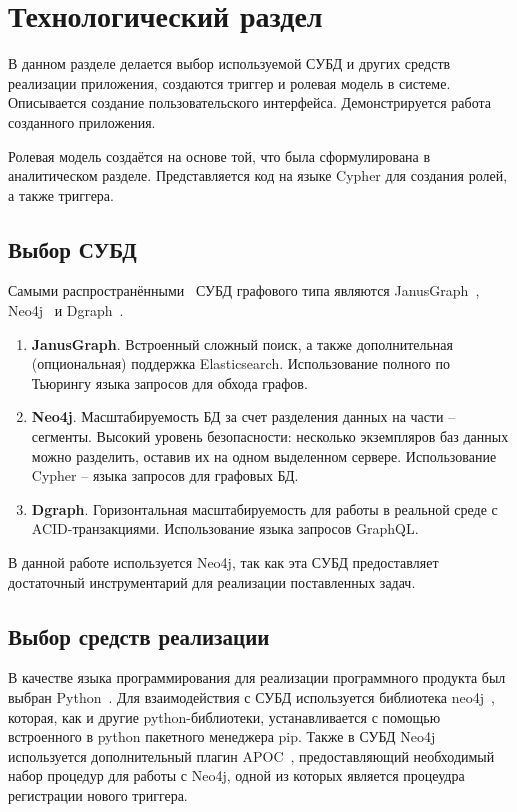 \chapter{Технологический раздел}

В данном разделе делается выбор используемой СУБД и других средств реализации приложения, создаются триггер и ролевая модель в системе. Описывается создание пользовательского интерфейса.
Демонстрируется работа созданного приложения.

Ролевая модель создаётся на основе той, что была сформулирована в аналитическом разделе. Представляется код на языке Cypher для создания ролей, а также триггера.

\section{Выбор СУБД}

Самыми распространёнными~\cite{popular} СУБД графового типа являются \newline JanusGraph~\cite{janusgraph}, Neo4j~\cite{neo4j} и Dgraph~\cite{dgraph}.

\begin{enumerate}[label=\arabic*.]
	\item \textbf{JanusGraph}. Встроенный сложный поиск, а также дополнительная (опциональная) поддержка Elasticsearch. Использование полного по Тьюрингу языка запросов для обхода графов.
	\item \textbf{Neo4j}. Масштабируемость БД за счет разделения данных на части – сегменты. Высокий уровень безопасности: несколько экземпляров баз данных можно разделить, оставив их на одном выделенном сервере. Использование Cypher – языка запросов для графовых БД.
	\item \textbf{Dgraph}. Горизонтальная масштабируемость для работы в реальной среде с ACID-транзакциями. Использование языка запросов GraphQL.
\end{enumerate}

В данной работе используется Neo4j, так как эта СУБД предоставляет достаточный инструментарий для реализации поставленных задач.

\section{Выбор средств реализации}

В качестве языка программирования для реализации программного продукта был выбран Python~\cite{python}. 
Для взаимодействия с СУБД используется библиотека neo4j~\cite{pythonwithneo4j}, которая, как и другие python-библиотеки, устанавливается с помощью встроенного в python пакетного менеджера pip.
Также в СУБД Neo4j используется дополнительный плагин APOC~\cite{apoc}, предоставляющий необходимый набор процедур для работы с Neo4j, одной из которых является процеудра регистрации нового триггера.

